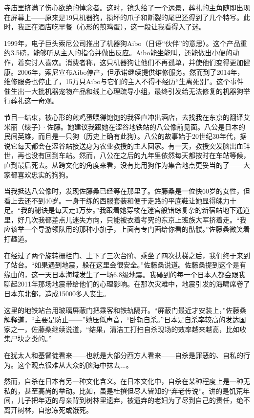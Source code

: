 \documentclass[12pt,oneside]{book}
\begin{document}
寺庙里挤满了伤心欲绝的悼念者。这时，镜头给了一个远景，葬礼的主角随即出现在屏幕上——原来是19只机器狗，损坏的爪子和断裂的尾巴还得到了几个特写。此时，我正在酒店吃早餐（心形的煎鸡蛋），这一段让我看得入了迷。

1999年，电子巨头索尼公司推出了机器狗Aibo（日语“伙伴”的意思）。这个产品重约3.5磅，能够听从主人的指令并做出反应。Aibo能坐能叫，还能做出小便的动作，着实讨人喜欢。消费者称，这只机器狗让他们不再孤单，并使他们变得更加健康。2006年，索尼宣布Aibo停产，但承诺继续提供维修服务。然而到了2014年，维修服务也停止了，15万只Aibo与它们的主人不得不经历“生离死别”。这个事件催生出一大批机器宠物产品和线上心理疏导小组，最终引发给无法修复的机器狗举行葬礼这一奇观。

节目一结束，被心形的煎鸡蛋喂得饱饱的我径直冲出酒店，去找我在东京的翻译艾米丽（绫子）·佐藤。她建议我跟她在涩谷地铁站的八公像前见面。八公是日本的民间英雄，而且是一只狗（历史上确有此狗）。八公的故事始于20世纪30年代，据说它每天都会在涩谷站接送身为农业教授的主人回家。有一天，教授突发脑出血辞世，再也没有回到车站。然而，八公在之后的九年里依然每天都按时在车站等候，直到最后死去。从跨文化的角度来看，没有比用狗作为集合地点更妥当的了——大家都喜欢忠实的狗狗。

当我抵达八公像时，发现佐藤桑已经等在那里了。佐藤桑是一位快60岁的女性，但看上去还不到40岁。一身干练的西服套装和便于走路的平底鞋让她显得魄力十足。“我的秘诀是每天走1万步。”我跟着她穿梭在迷宫般错综复杂的新宿站地下通道里，好几次我都差点儿迷失方向，只能被衣着考究的东京上班族大军挤着走。“我应该举一个导游领队用的那种小旗子，上面有专门画给你看的骷髅。”佐藤桑微笑着打趣道。

在经过了两个旋转栅栏门、上下了三次台阶、乘坐了四次扶梯之后，我们终于来到了站台。“如果遇到地震，躲在这里会很安全。”佐藤桑说道。佐藤桑提到这个是有缘由的，这一天日本海域发生了一场6.8级地震。我碰到的每一个日本人都会跟我聊起2011年那场地震带给他们的心理影响。在那次灾难中，地震引发的海啸席卷了日本东北部，造成15000多人丧生。

这里的地铁站台用玻璃屏蔽门把乘客和铁轨隔开。“屏蔽门最近才安装上，”佐藤桑解释道，“主要是防止——”她压低声音，“卧轨自杀。”日本是自杀率较高的发达国家之一，佐藤桑继续说道，“结果，清洁工打扫自杀现场的效率越来越高，比如收集尸块之类的。”

在犹太人和基督徒看来——也就是大部分西方人看来——自杀是罪恶的、自私的行为。这个观点很难从大众的脑海中抹去...。

然而，自杀在日本有另一种文化含义。在日本文化中，自杀在某种程度上是一种无私的，甚至高尚的举动。比如，虽是杜撰但尽人皆知的“弃老传说”。讲的是饥荒年间，儿子把年迈的母亲背到树林里遗弃，被遗弃的老妇为了尽到自己的责任，绝不离开树林，自愿冻死或饿死。
\end{document}
